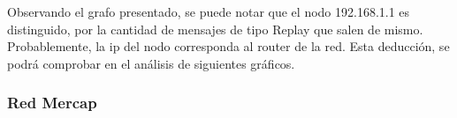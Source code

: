 Observando el grafo presentado, se puede notar que el nodo 192.168.1.1 es distinguido, por la cantidad de mensajes de tipo Replay que salen de mismo. Probablemente, la ip del nodo corresponda al router de la red. Esta  deducción, se podrá comprobar en el análisis de siguientes gráficos.

\subsubsection{Red Mercap}
